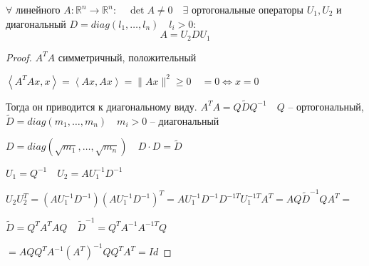 \documentclass{book}
\newcommand\R{\ensuremath{\mathbb{R}}}
\newcommand{\tl}[1]{\widetilde{#1}}
\theoremstyle{definition}
\begin{document}
\begin{statement}
    $\forall $ линейного $A: \R^n \to \R^n:\quad \det A \neq  0\quad \exists $ ортогональные операторы $U_1, U_2$ и диагональный $D = diag\left( l_1, \ldots, l_n \right) \quad l_i >0:$ \[A = U_2DU_1\]
\end{statement}
\begin{proof}
    $A^TA$ симметричный, положительный
    
    $\left<A^TAx, x \right> = \left<Ax, Ax \right> = \|Ax\|^2 \geqslant 0\quad =0 \iff x = 0$

    Тогда он приводится к диагональному виду. $A^TA  =Q\tl DQ^{-1}\quad Q$ -- ортогональный,  $\tl D = diag\left( m_1, \ldots, m_n \right)\quad m_i >0 $ -- диагональный

    $D = diag\left( \sqrt{m_1}, \ldots, \sqrt{m_n} \right) \quad D\cdot D = \tl D$

    $U_1 = Q^{-1}\quad U_2 = AU_1^{-1}D^{-1}$

    $U_2U_2^T = \left( AU_1^{-1}D^{-1} \right)\left( AU_1^{-1}D^{-1} \right)^T  = AU_1^{-1}D^{-1}D^{-1T}U_1^{-1T}A^T  = AQ\tl D^{-1}QA^T = $

    $\tl D = Q^TA^TAQ\quad \tl D^{-1} = Q^TA^{-1}A^{-1T}Q$

    $= AQQ^TA^{-1}(A^T)^{-1}Q Q^TA^T = Id$
\end{proof}
\end{document}
